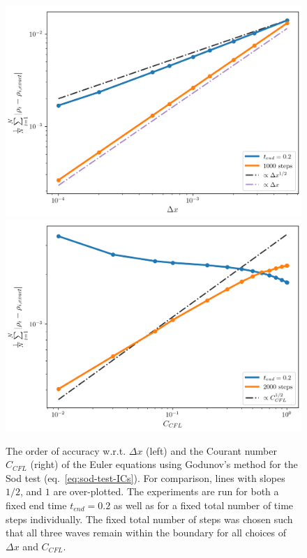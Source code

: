 \begin{figure}
    \centering
    \includegraphics[width=.5\textwidth]{
    ./figures/FV/godunov_euler/accuracy_dx.png}%
    \includegraphics[width=.5\textwidth]{
    ./figures/FV/godunov_euler/accuracy_CFL.png}%
    \caption[Order of accuracy w.r.t $\Delta x$ and $C_{CFL}$ for Euler equations using Godunov's
method.]{
The order of accuracy w.r.t. $\Delta x$ (left) and the Courant number $C_{CFL}$ (right) of
the Euler equations using Godunov's method for the Sod test (eq.~\ref{eq:sod-test-ICs}). For
comparison, lines with slopes $1/2$, and $1$ are over-plotted. The experiments are run for both a
fixed end time $t_{end} = 0.2$ as well as for a fixed total number of time steps individually. The
fixed total number of steps was chosen such that all three waves remain within the boundary for all
choices of $\Delta x$ and $C_{CFL}$.
    }%
    \label{fig:godunov-accuracy}
\end{figure}















